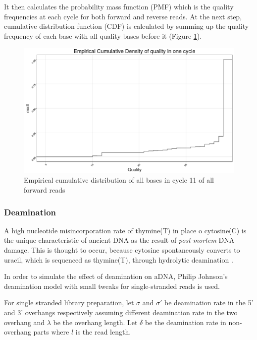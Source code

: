\documentclass[11pt,a4paper]{report}
\begin{document}
It then calculates the probability mass function (PMF) which is the quality 
frequencies at each cycle for both forward and reverse reads. At the next 
step, cumulative distribution function (CDF) is calculated by summing up the 
quality frequency of each base with all quality bases before it (Figure \ref{CDF}).

\begin{figure}[H]
\centering
\includegraphics[width=12cm]{pictures/Rplot_ecdf.png}
\caption{Empirical cumulative distribution of all bases in cycle 11 of all forward 
reads}
\label{CDF}
\end{figure}


\subsubsection{Deamination} \label{Deamination}

A high nucleotide misincorporation rate of thymine(T) in place o
cytosine(C) is the unique characteristic of ancient DNA as the result of
\emph{post-mortem} DNA damage.  This is thought to occur, because
cytosine spontaneously converts to uracil, which is sequenced as
thymine(T), through hydrolytic deamination
\cite{mapdamage2}\cite{damagepattern}.

In order to simulate the effect of deamination on aDNA, 
Philip Johnson's deamination model\cite{mapdamage2}  
with small tweaks for single-stranded reads is used.

For single stranded library preparation,
let $\sigma$ and $\sigma'$ be deamination rate in the 5' 
and 3' overhangs respectively assuming different deamination rate 
in the two overhang and $\lambda$ be the overhang length. 
Let  $\delta$ be the deamination rate in non-overhang parts 
where $l$ is the read length.
\end{document}
